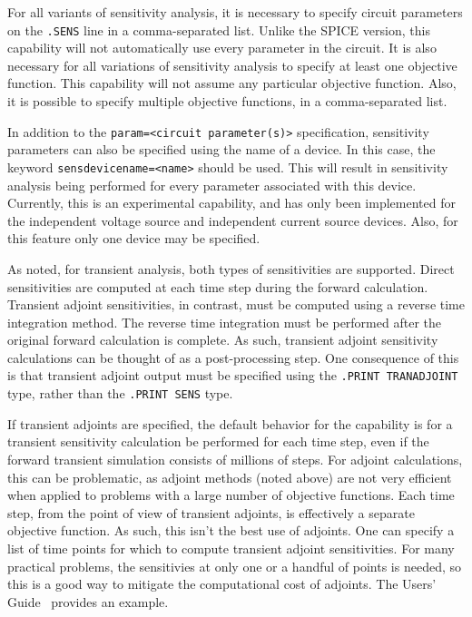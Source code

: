 \begin{Command}
For all variants of sensitivity analysis, it is necessary to specify 
circuit parameters on the \texttt{.SENS} line in a comma-separated list.  Unlike the SPICE version, 
this capability will not automatically use every parameter in the circuit.
It is also necessary for all variations of sensitivity analysis to specify at least 
one objective function.  This capability will not assume any particular 
objective function.  Also, it is possible to specify multiple
objective functions, in a comma-separated list.

In addition to the \texttt{param=<circuit parameter(s)>} specification, sensitivity parameters 
can also be specified using the name of a device.  In this case, the keyword \texttt{sensdevicename=<name>} should be used.
This will result in sensitivity analysis being performed for every parameter associated with this device.
Currently, this is an experimental capability, and has only been implemented for the 
independent voltage source and independent current source devices.  
Also, for this feature only one device may be specified.

As noted, for transient analysis, both types of sensitivities are supported.
Direct sensitivities are computed at each time step during the forward 
calculation.  Transient adjoint sensitivities, in contrast, must be computed
using a reverse time integration method.  The reverse time integration must be 
performed after the original forward calculation is complete.  As such, transient 
adjoint sensitivity calculations can be thought of as a post-processing step.  
One consequence of this is that transient adjoint output must be specified using 
the \texttt{.PRINT TRANADJOINT} type, rather than the \texttt{.PRINT SENS} 
type.

If transient adjoints are specified, the default behavior for the capability is 
for a transient sensitivity calculation be performed for each time step, even 
if the forward transient simulation consists of millions of steps.  For adjoint 
calculations, this can be problematic, as adjoint methods (noted above) are not 
very efficient when applied to problems with a large number of objective functions.
Each time step, from the point of view of transient adjoints, is effectively a 
separate objective function.  As such, this isn't the best use of adjoints.  
One can specify  a list of time points for which to compute transient adjoint
sensitivities. For many practical problems, the sensitivies at only one or a 
handful of points is needed, so this is a good way to mitigate the computational 
cost of adjoints.  The \Xyce{} Users' Guide~\UsersGuide{} provides an example.


\end{Command}
